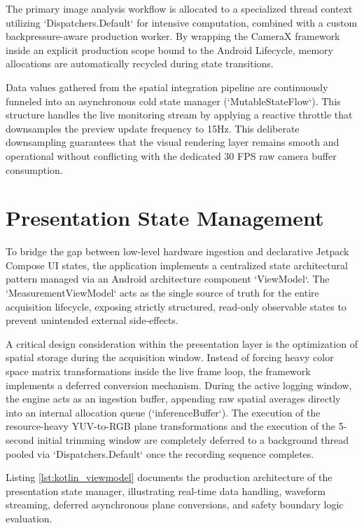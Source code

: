 The primary image analysis workflow is allocated to a specialized thread context utilizing `Dispatchers.Default` for intensive computation, combined with a custom backpressure-aware production worker. By wrapping the CameraX framework inside an explicit production scope bound to the Android Lifecycle, memory allocations are automatically recycled during state transitions. 

Data values gathered from the spatial integration pipeline are continuously funneled into an asynchronous cold state manager (`MutableStateFlow`). This structure handles the live monitoring stream by applying a reactive throttle that downsamples the preview update frequency to 15Hz. This deliberate downsampling guarantees that the visual rendering layer remains smooth and operational without conflicting with the dedicated 30 FPS raw camera buffer consumption.

\section{Presentation State Management}
To bridge the gap between low-level hardware ingestion and declarative Jetpack Compose UI states, the application implements a centralized state architectural pattern managed via an Android architecture component `ViewModel`. The `MeasurementViewModel` acts as the single source of truth for the entire acquisition lifecycle, exposing strictly structured, read-only observable states to prevent unintended external side-effects.

A critical design consideration within the presentation layer is the optimization of spatial storage during the acquisition window. Instead of forcing heavy color space matrix transformations inside the live frame loop, the framework implements a deferred conversion mechanism. During the active logging window, the engine acts as an ingestion buffer, appending raw spatial averages directly into an internal allocation queue (`inferenceBuffer`). The execution of the resource-heavy YUV-to-RGB plane transformations and the execution of the 5-second initial trimming window are completely deferred to a background thread pooled via `Dispatchers.Default` once the recording sequence completes. 

Listing \ref{lst:kotlin_viewmodel} documents the production architecture of the presentation state manager, illustrating real-time data handling, waveform streaming, deferred asynchronous plane conversions, and safety boundary logic evaluation.

